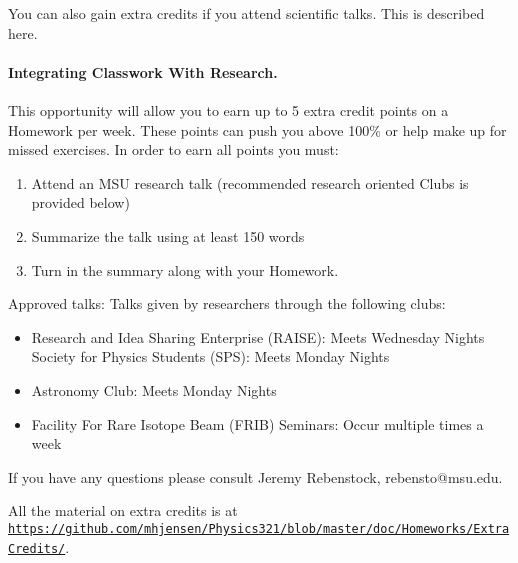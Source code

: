 \documentclass[%
oneside,                 %
final,                   %
10pt]{article}
\begin{document}
\noindent

You can also gain extra credits if you attend scientific talks.
This is described here.


\paragraph{Integrating Classwork With Research.}
This opportunity will allow you to earn up to 5 extra credit points on a Homework per week. These points can push you above 100\% or help make up for missed exercises.
In order to earn all points you must:

\begin{enumerate}
\item Attend an MSU research talk (recommended research oriented Clubs is  provided below)

\item Summarize the talk using at least 150 words

\item Turn in the summary along with your Homework.
\end{enumerate}

\noindent
Approved talks:
Talks given by researchers through the following clubs:
\begin{itemize}
\item Research and Idea Sharing Enterprise (RAISE)​: Meets Wednesday Nights Society for Physics Students (SPS)​: Meets Monday Nights

\item Astronomy Club​: Meets Monday Nights

\item Facility For Rare Isotope Beam (FRIB) Seminars: ​Occur multiple times a week
\end{itemize}

\noindent
If you have any questions please consult Jeremy Rebenstock, rebensto@msu.edu.

All the material on extra credits is at \href{{https://github.com/mhjensen/Physics321/blob/master/doc/Homeworks/ExtraCredits/}}{\nolinkurl{https://github.com/mhjensen/Physics321/blob/master/doc/Homeworks/ExtraCredits/}}. 


\end{document}
